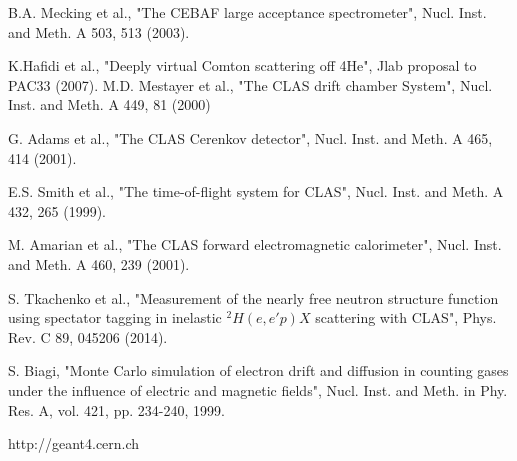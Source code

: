 \documentclass[reprint, amsmath,amssymb, aps]{revtex4}
\begin{document}
\begin{thebibliography}{}
B.A. Mecking et al., "The CEBAF large acceptance spectrometer", Nucl. Inst. and Meth. A 503, 513 (2003).

K.Hafidi et al., "Deeply virtual Comton scattering off 4He", Jlab proposal to PAC33 (2007).
M.D. Mestayer et al., "The CLAS drift chamber System", Nucl. Inst. and Meth. A 449, 81 (2000)

G. Adams et al., "The CLAS Cerenkov detector", Nucl. Inst. and Meth. A 465, 414 (2001).

E.S. Smith et al., "The time-of-flight system for CLAS", Nucl. Inst. and Meth. A 432, 265 (1999).

M. Amarian et al., "The CLAS forward electromagnetic calorimeter", Nucl. Inst. and Meth. A 460, 239 (2001). 

S. Tkachenko et al., "Measurement of the nearly free neutron structure function using spectator tagging in inelastic $^{2}H(e,e'p)X$ scattering with CLAS",	Phys. Rev. C 89, 045206 (2014).

S. Biagi, "Monte Carlo simulation of electron drift and diffusion in counting gases under the influence of electric and magnetic fields", Nucl. Inst. and Meth. in Phy. Res. A, vol. 421, pp. 234-240, 1999.

http://geant4.cern.ch

\end{thebibliography}
\end{document}
